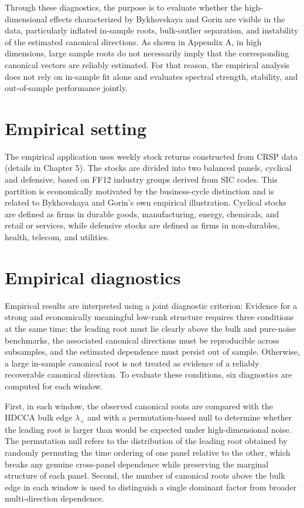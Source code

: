 \documentclass[12pt]{report} %
\begin{document}
Through these diagnostics, the purpose is to evaluate whether the high-dimensional effects characterized
by Bykhovskaya and Gorin are visible in the data, particularly inflated in-sample roots, bulk-outlier 
separation, and instability of the estimated canonical directions. As shown in Appendix A, 
in high dimensions, large sample roots do not necessarily imply that the corresponding canonical 
vectors are reliably estimated. For that reason, the empirical analysis does not rely on 
in-sample fit alone and evaluates spectral strength, stability, and out-of-sample 
performance jointly.

\section{Empirical setting}

The empirical application uses weekly stock returns constructed from CRSP data (details in Chapter 5). 
The stocks are divided into 
two balanced panels, cyclical and defensive, based on FF12 industry groups derived from SIC codes. 
This partition is economically motivated by the business-cycle distinction and 
is related to Bykhovskaya and Gorin’s own empirical illustration. Cyclical stocks are defined as firms in durable goods, 
manufacturing, energy, chemicals, and retail or services, while defensive stocks are defined as firms 
in non-durables, health, telecom, and utilities.

\section{Empirical diagnostics}

Empirical results are interpreted using a joint diagnostic criterion: Evidence for a strong and economically 
meaningful low-rank structure requires three conditions at the same time: the leading root 
must lie clearly above the bulk and pure-noise benchmarks, the associated canonical directions 
must be reproducible across subsamples, and the estimated dependence must persist out of sample.
Otherwise, a large in-sample canonical root is not treated as evidence of a reliably recoverable 
canonical direction. To evaluate these conditions, six diagnostics are computed for each window.

First, in each window, the observed canonical roots are compared with the HDCCA bulk edge $\lambda_+$ 
and with a permutation-based null to determine whether the leading root is larger than would be 
expected under high-dimensional noise. The permutation null refers to the distribution of the leading 
root obtained by randomly permuting the time ordering of one panel relative to the other, which 
breaks any genuine cross-panel dependence while preserving the marginal structure of each panel. 
Second, the number of canonical roots above the bulk edge in each window is used
to distinguish a single dominant factor from broader multi-direction dependence.
\end{document}
